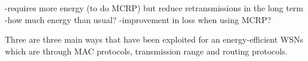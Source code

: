 
 




-requires more energy (to do MCRP) but reduce retransmissions in the long term
-how much energy than usual?
-improvement in loss when using MCRP?

Three are three main ways that have been exploited for an energy-efficient WSNs which are through MAC protocols, transmission range and routing protocols.


